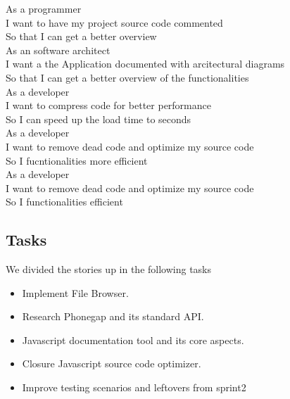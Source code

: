 As a programmer\\
I want to have my project source code commented  \\
So that I can get a better overview \\

As an software architect\\
I want a the Application documented with arcitectural diagrams \\
So that I can get a better overview of the functionalities\\

As a developer\\
I want to compress code for better performance\\
So I can speed up the load time to seconds\\

As a developer\\
I want to remove dead code and optimize my source code\\
So I fucntionalities more efficient\\

As a developer\\
I want to remove dead code and optimize my source code\\
So I functionalities efficient\\


\subsection{Tasks} %
\label{sub:Tasks}
We divided the stories up in the following tasks
\begin{itemize}
	\item Implement File Browser.
	\item Research Phonegap and its standard API. 
	\item Javascript documentation tool and its core aspects.
	\item Closure Javascript source code optimizer.
	\item Improve testing scenarios and leftovers from sprint2
\end{itemize}










